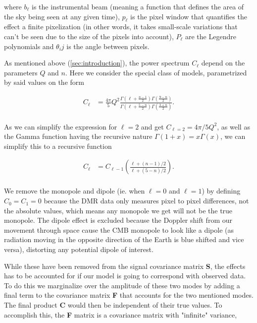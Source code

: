 \documentclass{emulateapj}
\begin{document}
 \noindent
 where $b_{\ell}$ is the instrumental beam (meaning a function that defines the area of the sky being seen at any given time), $p_{\ell}$ is the pixel window that quantifies the effect a finite pixelization (in other words, it takes small-scale variations that can't be seen due to the size of the pixels into account), $P_{\ell}$ are the Legendre polynomials and $\theta_ij$ is the angle between pixels.
 
 As mentioned above (\ref{sec:introduction}), the power spectrum $C_\ell$ depend on the parameters $Q$ and $n$. Here we consider the special class of models, parametrized by said values on the form
 
  \begin{equation}
  \label{c_ell}
  \begin{array}{rl}
  C_{\ell} &= \frac{4\pi}{5}Q^2 \frac{\Gamma(\ell + \frac{n-1}{2})\Gamma(\frac{9-n}{2})}{\Gamma(\ell + \frac{5-n}{2})\Gamma(\frac{3+n}{2})}.  \\ 
  \end{array}
  \end{equation}
 
\noindent
As we can simplify the expression for $\ell = 2$ and get $C_{\ell=2} = 4\pi/5 Q^2$, as well as the Gamma function having the recursive nature $\Gamma(1+x) = x\Gamma(x)$, we can simplify this to a recursive function  
 
 
\begin{equation}
  \label{c_ell_num}
  \begin{array}{rl}
  C_{\ell} &= C_{\ell - 1} (\frac{\ell+(n-1)/2}{\ell+(5-n)/2}).   \\ 
  \end{array}
\end{equation}


\noindent
We remove the monopole and dipole (ie. when $\ell = 0$ and $\ell = 1$) by defining $C_0 = C_1 = 0$ because the DMR data only measures pixel to pixel differences, not the absolute values, which means any monopole we get will not be the true monopole. The dipole effect is excluded because the Doppler shift from our movement through space cause the CMB monopole to look like a dipole (as radiation moving in the opposite direction of the Earth is blue shifted and vice versa), distorting any potential dipole of interest.
 
While these have been removed from the signal covariance matrix \textbf{S}, the effects has to be accounted for if our model is going to correspond with observed data. To do this we marginalize over the amplitude of these two modes by adding a final term to the covariance matrix \textbf{F} that accounts for the two mentioned modes. %
The final product \textbf{C} would then be independent of their true values. To accomplish this, the \textbf{F} matrix is a covariance matrix with "infinite" variance,
\end{document}

